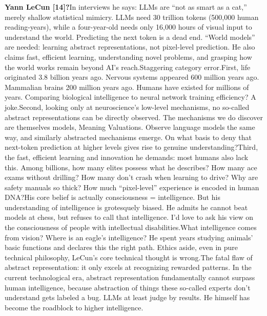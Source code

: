 \documentclass[11pt]{article}
\renewcommand{\\}[1][\mynewlineskip]{\oldnewline[#1]}
\begin{document}
\vspace{1em}
\textbf{Yann LeCun [14]?}\\
In interviews he says: LLMs are ``not as smart as a cat,'' merely shallow statistical mimicry. LLMs need 30 trillion tokens (500,000 human reading-years), while a four-year-old needs only 16,000 hours of visual input to understand the world. Predicting the next token is a dead end. ``World models'' are needed: learning abstract representations, not pixel-level prediction. He also claims fast, efficient learning, understanding novel problems, and grasping how the world works remain beyond AI's reach.\\
Staggering category error.\\
First, life originated 3.8 billion years ago. Nervous systems appeared 600 million years ago. Mammalian brains 200 million years ago. Humans have existed for millions of years. Comparing biological intelligence to neural network training efficiency? A joke.\\
Second, looking only at neuroscience's low-level mechanisms, no so-called abstract representations can be directly observed. The mechanisms we do discover are themselves models, Meaning Valuations. Observe language models the same way, and similarly abstracted mechanisms emerge. On what basis to deny that next-token prediction at higher levels gives rise to genuine understanding?\\
Third, the fast, efficient learning and innovation he demands: most humans also lack this. Among billions, how many elites possess what he describes? How many ace exams without drilling? How many don't crash when learning to drive? Why are safety manuals so thick? How much ``pixel-level'' experience is encoded in human DNA?\\
His core belief is actually consciousness = intelligence. But his understanding of intelligence is grotesquely biased. He admits he cannot beat models at chess, but refuses to call that intelligence. I'd love to ask his view on the consciousness of people with intellectual disabilities.\\
What intelligence comes from vision? Where is an eagle's intelligence? He spent years studying animals' basic functions and declares this the right path. Ethics aside, even in pure technical philosophy, LeCun's core technical thought is wrong.\\
The fatal flaw of abstract representation: it only excels at recognizing rewarded patterns. In the current technological era, abstract representation fundamentally cannot surpass human intelligence, because abstraction of things these so-called experts don't understand gets labeled a bug. LLMs at least judge by results. He himself has become the roadblock to higher intelligence.\\
\end{document}

